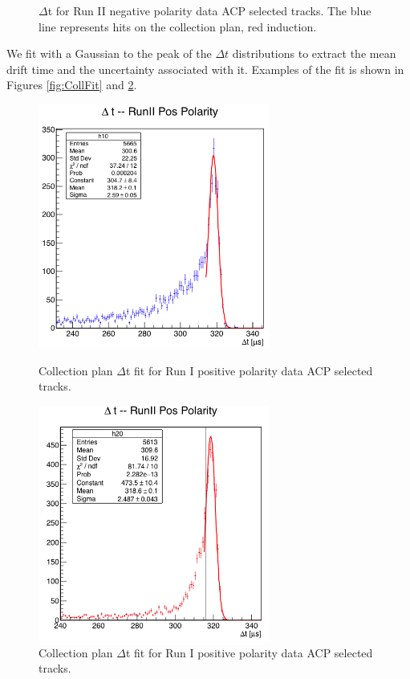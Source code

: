 \begin{figure}[]
\begin{minipage}{0.45\textwidth}
\caption{$\Delta$t for Run II negative polarity data ACP selected tracks.  The blue line represents hits on the collection plan, red induction.}
\label{fig:RunIINegACP}
\end{minipage}
\end{figure}

We fit with a Gaussian to the peak of the $\Delta t$ distributions to extract the mean drift time and the uncertainty associated with it. Examples of the fit is shown in Figures \ref{fig:CollFit} and \ref{fig:IndFit}.  
\begin{figure}[h!]
\centering
\begin{minipage}{0.45\textwidth}
\centering
\includegraphics[width=3in]{images/CollectionFitRunIIPos.png}
\caption{Collection plan $\Delta$t fit  for Run I positive polarity data ACP selected tracks. }
\label{fig:CollFit}
\end{minipage}\hfill
\begin{minipage}{0.45\textwidth}
\centering
\includegraphics[width=3in]{images/InductionFitRunIIPos.png}
\caption{Collection plan $\Delta$t fit  for Run I positive polarity data ACP selected tracks. }
\label{fig:IndFit}
\end{minipage}
\end{figure}

